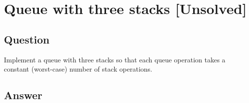 \section{Queue with three stacks [Unsolved]}

\subsection*{Question}
Implement a queue with three stacks so that each
queue operation takes a constant (worst-case) number of stack operations.

\subsection*{Answer}
